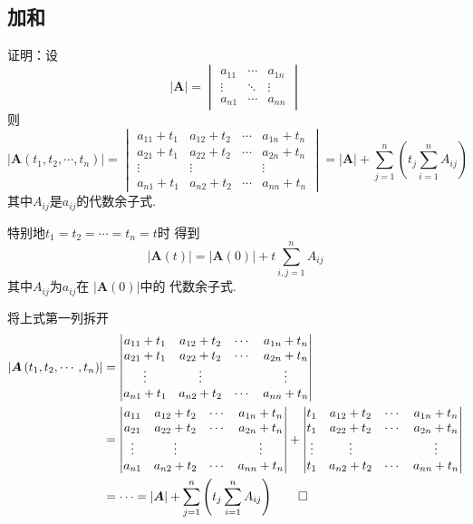 \subsection{加和}
\begin{brown}
    \begin{example}\label{example:加和}
	证明：设
	\[
	\left|\bm{A}\right|
	=\begin{vmatrix}
	a_{11} & \cdots & a_{1n}\\
	\vdots &\ddots&\vdots\\
	a_{n1}&\cdots &a_{nn}
\end{vmatrix}
	\]
	则
	\[
	\left|\bm{A}\left(
		t_1,t_2,\cdots,t_n
	\right)\right|
	=\begin{vmatrix}
	a_{11}+t_1 & a_{12}+t_2&
	\cdots & a_{1n}+t_n\\
	a_{21}+t_1 & a_{22}+t_2&
	\cdots & a_{2n}+t_n\\
	\vdots &\vdots&&\vdots\\
	a_{n1}+t_1&a_{n2}+t_2&
	\cdots &a_{nn}+t_n
\end{vmatrix}
=\left|\bm{A}\right|
+\sum_{j=1}^{n}\left(
	t_j\sum_{i=1}^{n}
	A_{ij}
\right)
	\]
    其中$A_{ij}$是$a_{ij}$的代数余子式.

特别地$
t_1 = t_2 = \cdots = t_n = t
$时
得到
\[
\left|\bm{A}\left(t\right)\right|
=\left|\bm{A}\left(0\right)\right|
+t\sum_{i,j=1}^{n}A_{ij}
\]
其中$A_{ij}$为$a_{ij}$在
$\left|\bm{A}\left(0\right)\right|$中的
代数余子式.\end{example}
    \begin{Proof}
	将上式第一列拆开
	\begin{align*}
		\left|\bm{A}\left(
		t_1,t_2,\cdots,t_n
	\right)\right|
	&=\begin{vmatrix}
	a_{11}+t_1 & a_{12}+t_2&
	\cdots & a_{1n}+t_n\\
	a_{21}+t_1 & a_{22}+t_2&
	\cdots & a_{2n}+t_n\\
	\vdots &\vdots&&\vdots\\
	a_{n1}+t_1&a_{n2}+t_2&
	\cdots &a_{nn}+t_n
\end{vmatrix}\\
&=\begin{vmatrix}
	a_{11} & a_{12}+t_2&
	\cdots & a_{1n}+t_n\\
	a_{21} & a_{22}+t_2&
	\cdots & a_{2n}+t_n\\
	\vdots &\vdots&&\vdots\\
	a_{n1}&a_{n2}+t_2&
	\cdots &a_{nn}+t_n
\end{vmatrix}+
\begin{vmatrix}
	t_1 & a_{12}+t_2&
	\cdots & a_{1n}+t_n\\
	t_1 & a_{22}+t_2&
	\cdots & a_{2n}+t_n\\
	\vdots &\vdots&&\vdots\\
	t_1&a_{n2}+t_2&
	\cdots &a_{nn}+t_n
\end{vmatrix}\\
&=\cdots=
\left|\bm{A}\right|
+\sum_{j=1}^{n}\left(
	t_j\sum_{i=1}^{n}
	A_{ij}
	\right)\qedhere
	\end{align*}
\end{Proof}
\end{brown}
